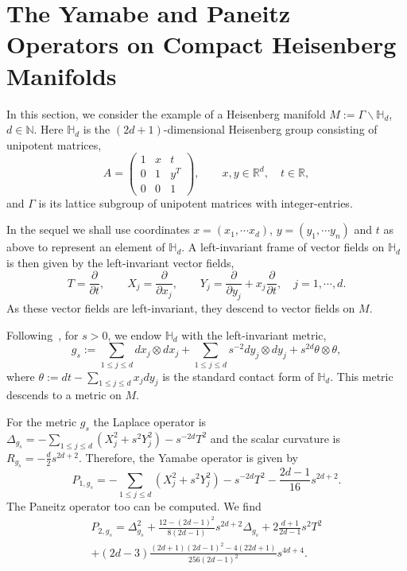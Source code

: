 \documentclass{amsart}
\theoremstyle{definition}
\theoremstyle{remark}
\begin{document}
 
\section{The Yamabe and Paneitz Operators on Compact Heisenberg Manifolds}\label{section: heisenberg}
In this section, we consider the example of a Heisenberg manifold $M:=\Gamma \backslash {\mathbb{H}}_{d}$, $d\in {\mathbb{N}}$. Here 
${\mathbb{H}}_{d}$ is the $(2d+1)$-dimensional Heisenberg group consisting of unipotent matrices, 
\begin{equation*}
A=    \begin{pmatrix}
1 & x & t\\
0 & 1 & y^{T}\\
0&0&1
\end{pmatrix}, \qquad x,y\in {{\mathbb{R}}}^{d}, \quad t\in {{\mathbb{R}}},
\end{equation*}and $\Gamma$ is its lattice subgroup of unipotent matrices with integer-entries. 

In the sequel we shall use coordinates $x=(x_{1},\cdots x_{d})$, $y=(y_{1},\cdots y_{n})$ and $t$ as above to represent an element of
${\mathbb{H}}_{d}$. A left-invariant frame of vector fields on ${\mathbb{H}}_{d}$ is then given by the left-invariant vector fields,
\begin{equation*}
 T=\frac{{\partial}}{{{\partial}} t}, \qquad  X_{j}=\frac{{\partial}}{{{\partial}} x_{j}},
\qquad Y_{j}=\frac{{\partial}}{{{\partial}} y_{j}}+x_{j}\frac{{\partial}}{{{\partial}} t},
\quad j=1,\cdots, d.
\end{equation*}As these vector fields are left-invariant, they descend to vector fields on $M$. 

Following~\cite{GW}, for $s>0$, we endow ${\mathbb{H}}_{d}$ with the
left-invariant metric,
\begin{equation}
    g_{s}:= \sum_{1\leq j \leq d}dx_{j}
\otimes dx_{j}+\sum_{1\leq j \leq d}s^{-2}dy_{j}\otimes dy_{j}+s^{2d} \theta
    \otimes \theta,
    \label{eq:Heisenberg.metric-gs}
\end{equation}where $\theta:=dt -\sum_{1\leq j \leq d}x_{j}dy_{j}$ is the standard contact form of ${\mathbb{H}}_{d}$. This 
metric descends to a metric on $M$. 

For the metric $g_{s}$ the Laplace operator is
$\Delta_{g_{s}}=-\sum_{1\leq j \leq d}(X_{j}^{2}+s^{2}Y_{j}^{2})
-s^{-2d}T^{2}$ and the scalar curvature is $R_{g_{s}}=
-\frac{d}{2}s^{2d+2}$. Therefore, the Yamabe operator is given by
\begin{equation*}
   P_{1,g_{s}}= -\sum_{1\leq j \leq d}(X_{j}^{2}+s^{2}Y_{j}^{2}) -s^{-2d}T^{2}-\frac{2d-1}{16}s^{2d+2}. 
\end{equation*}
The Paneitz operator too can be computed. We find
\begin{multline*}
    P_{2,g_{s}}=\Delta_{g_{s}}^{2}+\frac{12-(2d-1)^{2}}{8(2d-1)}s^{2d+2}\Delta_{g_{s}}+2\frac{d+1}{2d-1}s^{2}T^{2}\\ +
    (2d-3)\frac{(2d+1)(2d-1)^{2}-4(22d+1)}{256(2d-1)^{2}}s^{4d+4}.
\end{multline*}
\end{document}
